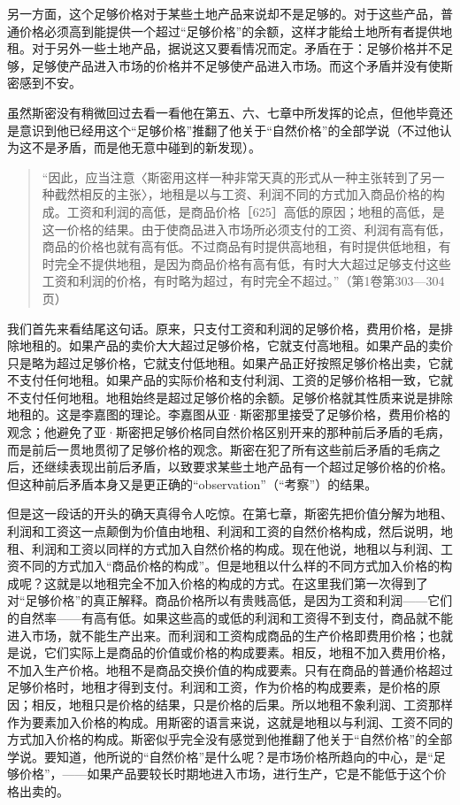 另一方面，这个足够价格对于某些土地产品来说却不是足够的。对于这些产品，普通价格必须高到能提供一个超过“足够价格”的余额，这样才能给土地所有者提供地租。对于另外一些土地产品，据说这又要看情况而定。矛盾在于：足够价格并不足够，足够使产品进入市场的价格并不足够使产品进入市场。而这个矛盾并没有使斯密感到不安。

虽然斯密没有稍微回过去看一看他在第五、六、七章中所发挥的论点，但他毕竟还是意识到他已经用这个“足够价格”推翻了他关于“自然价格”的全部学说（不过他认为这不是矛盾，而是他无意中碰到的新发现）。

\begin{quote}{“因此，应当注意〈斯密用这样一种非常天真的形式从一种主张转到了另一种截然相反的主张〉，地租是以与工资、利润不同的方式加入商品价格的构成。工资和利润的高低，是商品价格［625］高低的原因；地租的高低，是这一价格的结果。由于使商品进入市场所必须支付的工资、利润有高有低，商品的价格也就有高有低。不过商品有时提供高地租，有时提供低地租，有时完全不提供地租，是因为商品价格有高有低，有时大大超过足够支付这些工资和利润的价格，有时略为超过，有时完全不超过。”（第1卷第303—304页）}\end{quote}

我们首先来看结尾这句话。原来，只支付工资和利润的足够价格，费用价格，是排除地租的。如果产品的卖价大大超过足够价格，它就支付高地租。如果产品的卖价只是略为超过足够价格，它就支付低地租。如果产品正好按照足够价格出卖，它就不支付任何地租。如果产品的实际价格和支付利润、工资的足够价格相一致，它就不支付任何地租。地租始终是超过足够价格的余额。足够价格就其性质来说是排除地租的。这是李嘉图的理论。李嘉图从亚·斯密那里接受了足够价格，费用价格的观念；他避免了亚·斯密把足够价格同自然价格区别开来的那种前后矛盾的毛病，而是前后一贯地贯彻了足够价格的观念。斯密在犯了所有这些前后矛盾的毛病之后，还继续表现出前后矛盾，以致要求某些土地产品有一个超过足够价格的价格。但这种前后矛盾本身又是更正确的“observation”（“考察”）的结果。

但是这一段话的开头的确天真得令人吃惊。在第七章，斯密先把价值分解为地租、利润和工资这一点颠倒为价值由地租、利润和工资的自然价格构成，然后说明，地租、利润和工资以同样的方式加入自然价格的构成。现在他说，地租以与利润、工资不同的方式加入“商品价格的构成”。但是地租以什么样的不同方式加入价格的构成呢？这就是以地租完全不加入价格的构成的方式。在这里我们第一次得到了对“足够价格”的真正解释。商品价格所以有贵贱高低，是因为工资和利润——它们的自然率——有高有低。如果这些高的或低的利润和工资得不到支付，商品就不能进入市场，就不能生产出来。而利润和工资构成商品的生产价格即费用价格；也就是说，它们实际上是商品的价值或价格的构成要素。相反，地租不加入费用价格，不加入生产价格。地租不是商品交换价值的构成要素。只有在商品的普通价格超过足够价格时，地租才得到支付。利润和工资，作为价格的构成要素，是价格的原因；相反，地租只是价格的结果，只是价格的后果。所以地租不象利润、工资那样作为要素加入价格的构成。用斯密的语言来说，这就是地租以与利润、工资不同的方式加入价格的构成。斯密似乎完全没有感觉到他推翻了他关于“自然价格”的全部学说。要知道，他所说的“自然价格”是什么呢？是市场价格所趋向的中心，是“足够价格”，——如果产品要较长时期地进入市场，进行生产，它是不能低于这个价格出卖的。

